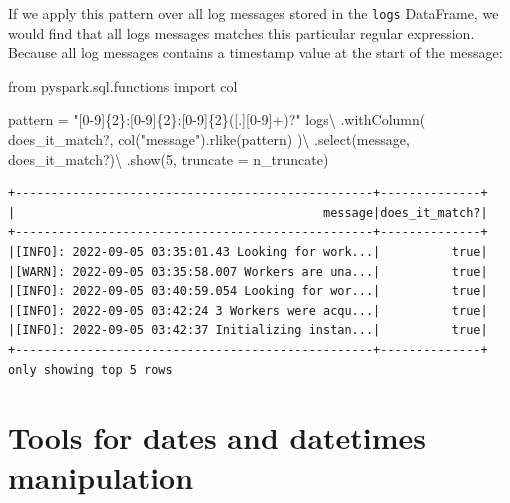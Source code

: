 \documentclass[
  11pt,
  letterpaper,
  DIV=11,
  numbers=noendperiod]{scrreprt}
\newenvironment{Shaded}{\begin{snugshade}}{\end{snugshade}}
\newcommand{\DecValTok}[1]{\textcolor[rgb]{0.68,0.00,0.00}{#1}}
\newcommand{\ImportTok}[1]{\textcolor[rgb]{0.00,0.46,0.62}{#1}}
\newcommand{\NormalTok}[1]{\textcolor[rgb]{0.00,0.23,0.31}{#1}}
\newcommand{\OperatorTok}[1]{\textcolor[rgb]{0.37,0.37,0.37}{#1}}
\newcommand{\SpecialCharTok}[1]{\textcolor[rgb]{0.37,0.37,0.37}{#1}}
\newcommand{\StringTok}[1]{\textcolor[rgb]{0.13,0.47,0.30}{#1}}
\begin{document}
If we apply this pattern over all log messages stored in the
\texttt{logs} DataFrame, we would find that all logs messages matches
this particular regular expression. Because all log messages contains a
timestamp value at the start of the message:

\begin{Shaded}
\begin{Highlighting}[]
\ImportTok{from}\NormalTok{ pyspark.sql.functions }\ImportTok{import}\NormalTok{ col}

\NormalTok{pattern }\OperatorTok{=} \StringTok{"[0{-}9]}\SpecialCharTok{\{2\}}\StringTok{:[0{-}9]}\SpecialCharTok{\{2\}}\StringTok{:[0{-}9]}\SpecialCharTok{\{2\}}\StringTok{([.][0{-}9]+)?"}
\NormalTok{logs}\OperatorTok{\textbackslash{}}
\NormalTok{    .withColumn(}
        \StringTok{\textquotesingle{}does\_it\_match?\textquotesingle{}}\NormalTok{,}
\NormalTok{        col(}\StringTok{"message"}\NormalTok{).rlike(pattern)}
\NormalTok{    )}\OperatorTok{\textbackslash{}}
\NormalTok{    .select(}\StringTok{\textquotesingle{}message\textquotesingle{}}\NormalTok{, }\StringTok{\textquotesingle{}does\_it\_match?\textquotesingle{}}\NormalTok{)}\OperatorTok{\textbackslash{}}
\NormalTok{    .show(}\DecValTok{5}\NormalTok{, truncate }\OperatorTok{=}\NormalTok{ n\_truncate)}
\end{Highlighting}
\end{Shaded}

\begin{verbatim}
+--------------------------------------------------+--------------+
|                                           message|does_it_match?|
+--------------------------------------------------+--------------+
|[INFO]: 2022-09-05 03:35:01.43 Looking for work...|          true|
|[WARN]: 2022-09-05 03:35:58.007 Workers are una...|          true|
|[INFO]: 2022-09-05 03:40:59.054 Looking for wor...|          true|
|[INFO]: 2022-09-05 03:42:24 3 Workers were acqu...|          true|
|[INFO]: 2022-09-05 03:42:37 Initializing instan...|          true|
+--------------------------------------------------+--------------+
only showing top 5 rows
\end{verbatim}


\hypertarget{sec-datetime-tools}{%
\chapter{Tools for dates and datetimes
manipulation}\label{sec-datetime-tools}}
\end{document}

